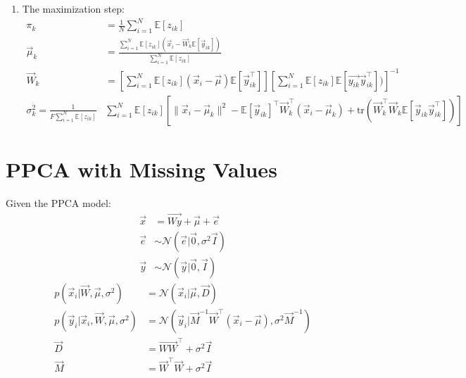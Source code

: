 \documentclass[12pt,twoside]{article}
\begin{document}
\begin{enumerate}
\item The maximization step:
\begin{align*}
\pi_k &= \frac{1}{N}\sum^N_{i=1} \mathbb{E}[z_{ik}]\\
\vec{\mu}_k &= \frac{\sum_{i=1}^N \mathbb{E}[z_{ik}](\vec{x}_i - \vec{W}_k \mathbb{E}[\vec{y}_{ik}])} {\sum_{i=1}^N \mathbb{E}[z_{ik}]}\\
\vec{W}_k & = \left[\sum_{i=1}^N\mathbb{E}[z_{ik}](\vec{x}_i - \vec{\mu})\mathbb{E}[\vec{y}_{ik}^\top]\right]\left[\sum_{i=1}^N\mathbb{E}[z_{ik}]\mathbb{E}[\vec{y_{ik}}\vec{y}_{ik}^\top])  \right]^{-1}\\
\sigma_k^2 = \frac{1}{F\sum_{i=1}^N \mathbb{E}[z_{ik}]}&\sum_{i=1}^N \mathbb{E}[z_{ik}]\left[\parallel\vec{x}_i-\vec{\mu}_k\parallel^2 - \mathbb{E}[\vec{y}_{ik}]^\top \vec{W}^\top_k(\vec{x}_i-\vec{\mu}_k) + \text{tr}\left(\vec{W}_k^\top \vec{W}_k \mathbb{E}[\vec{y}_{ik}\vec{y}_{ik}^\top]\right)\right]
\end{align*}

\end{enumerate}

\newpage

\section{PPCA with Missing Values}
Given the PPCA model:
\begin{align*}
\vec{x} &= \vec{Wy} + \vec{\mu} + \vec{e}\\
\vec{e} & \sim \mathcal{N}(\vec{e}\vert \vec{0}, \sigma^2\vec{I})\\
\vec{y} & \sim \mathcal{N}(\vec{y}\vert \vec{0}, \vec{I})
\end{align*}
\begin{align*}
p(\vec{x}_i \vert \vec{W}, \vec{\mu}, \sigma^2)&= \mathcal{N}(\vec{x}_i\vert \vec{\mu}, \vec{D})\\
p(\vec{y}_i \vert \vec{x}_i, \vec{W}, \vec{\mu}, \sigma^2)&=\mathcal{N}(\vec{y}_i \vert \vec{M}^{-1}\vec{W}^\top (\vec{x}_i-\vec{\mu}), \sigma^2\vec{M}^{-1})\\
\vec{D} &= \vec{WW}^\top +\sigma^2\vec{I} \\
\vec{M} &= \vec{W}^\top \vec{W} +\sigma^2\vec{I}
\end{align*}
\end{document}
